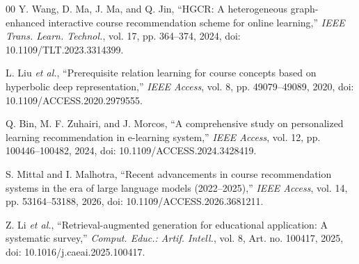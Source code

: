 \begin{thebibliography}{00}
 Y. Wang, D. Ma, J. Ma, and Q. Jin, ``HGCR: A heterogeneous graph-enhanced interactive course recommendation scheme for online learning,'' \emph{IEEE Trans. Learn. Technol.}, vol. 17, pp. 364--374, 2024, doi: 10.1109/TLT.2023.3314399.

 L. Liu \emph{et al.}, ``Prerequisite relation learning for course concepts based on hyperbolic deep representation,'' \emph{IEEE Access}, vol. 8, pp. 49079--49089, 2020, doi: 10.1109/ACCESS.2020.2979555.

 Q. Bin, M. F. Zuhairi, and J. Morcos, ``A comprehensive study on personalized learning recommendation in e-learning system,'' \emph{IEEE Access}, vol. 12, pp. 100446--100482, 2024, doi: 10.1109/ACCESS.2024.3428419.

 S. Mittal and I. Malhotra, ``Recent advancements in course recommendation systems in the era of large language models (2022--2025),'' \emph{IEEE Access}, vol. 14, pp. 53164--53188, 2026, doi: 10.1109/ACCESS.2026.3681211.


 Z. Li \emph{et al.}, ``Retrieval-augmented generation for educational application: A systematic survey,'' \emph{Comput. Educ.: Artif. Intell.}, vol. 8, Art. no. 100417, 2025, doi: 10.1016/j.caeai.2025.100417.



\end{thebibliography}
